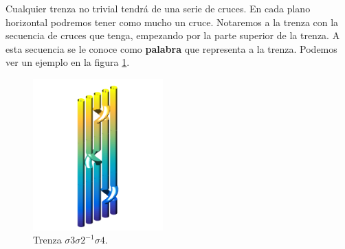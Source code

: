Cualquier trenza no trivial tendrá de una serie de cruces. En cada plano horizontal podremos tener como mucho un cruce. Notaremos a la trenza con la secuencia de cruces que tenga, empezando por la parte superior de la trenza. A esta secuencia se le conoce como \textbf{palabra} que representa a la trenza. Podemos ver un ejemplo en la figura \ref{tren5}.\\
\begin{figure}[h!]
	\centering
	\includegraphics[width=5cm]{itrenzas/t7.png}
	\caption{Trenza $\sigma3\sigma2^{-1}\sigma4$.}
	\label{tren5} 
\end{figure}


